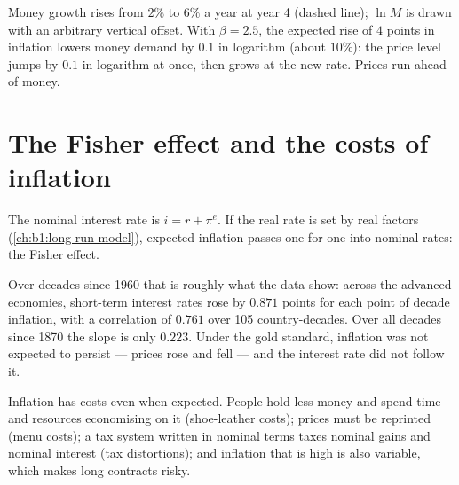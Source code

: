 \begin{omfigure}

{\small Money growth rises from $2\%$ to $6\%$ a year at year 4 (dashed line); $\ln M$
is drawn with an arbitrary vertical offset. With
$\beta = 2.5$, the expected rise of $4$ points in inflation lowers money demand by $0.1$ in
logarithm (about $10\%$):
the price level jumps by $0.1$ in logarithm at once, then grows at the new
rate. Prices run ahead of money.}
\end{omfigure}

\section{The Fisher effect and the costs of inflation}\label{sec:b1:money-and-inflation:fisher}

The nominal interest rate is $i = r + \pi^e$. If the real rate is set by real
factors (\cref{ch:b1:long-run-model}), expected inflation passes one for one
into nominal rates: the Fisher effect.

Over decades since 1960 that is roughly what the data show: across the
advanced economies, short-term interest rates rose by $0.871$ points for
each point of decade inflation, with a correlation of $0.761$ over 105
country-decades. Over all decades since 1870 the slope is only $0.223$.
Under the gold standard, inflation was not expected to persist --- prices
rose and fell --- and the interest rate did not follow it.

Inflation has costs even when expected. People hold less money and spend
time and resources economising on it (shoe-leather costs); prices must be
reprinted (menu costs); a tax system written in nominal terms taxes
nominal gains and nominal interest (tax distortions); and inflation that
is high is also variable, which makes long contracts risky.

